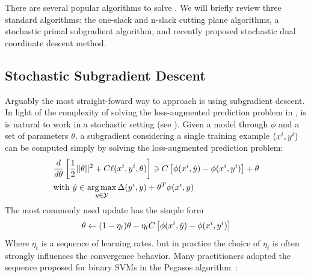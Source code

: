 There are several popular algorithms to solve . We
will briefly review three standard algorithms: the one-slack and n-slack
cutting plane algorithms, a stochastic primal subgradient algorithm, and
recently proposed stochastic dual coordinate descent method.

\subsection{Stochastic Subgradient Descent}
Arguably the most straight-foward way to approach  is
using subgradient descent.  In light of the complexity of solving the
loss-augmented prediction problem in , is is natural
to work in a stochastic setting (see \citet{ratliff2007online}).
Given a model through $\phi$ and a set of parameters $\theta$, a subgradient
considering a single training example $(x^{i}, y^{i})$
can be computed simply by solving the loss-augmented prediction problem:
\begin{align}
    &\frac{d}{d\theta} \left [ \frac{1}{2} ||\theta||^2 + C \ell(x^{i}, y^{i}, \theta) \right ] \ni C\left [ \phi(x^{i}, \hat{y}) - \phi(x^{i}, y^{i}) \right]+ \theta\\
    &\text{with }\hat{y} \in \operatorname*{arg\,max}_{y \in \mathcal{Y}} \Delta(y^{i}, y) + \theta^T \phi(x^{i}, y)
\end{align}
The most commonly used update has the simple form
\begin{equation}
    \theta \leftarrow (1 - \eta_t) \theta - \eta_t C \left [\phi(x^{i}, \hat{y}) - \phi(x^{i}, y^{i})\right]
\end{equation}
Where $\eta_t$ is a sequence of learning rates.
but in practice the choice of $\eta_t$ is often strongly influences the convergence behavior.
Many practitioners adopted the sequence proposed for binary SVMs in the Pegasos algorithm~\citep{pegasos}:



